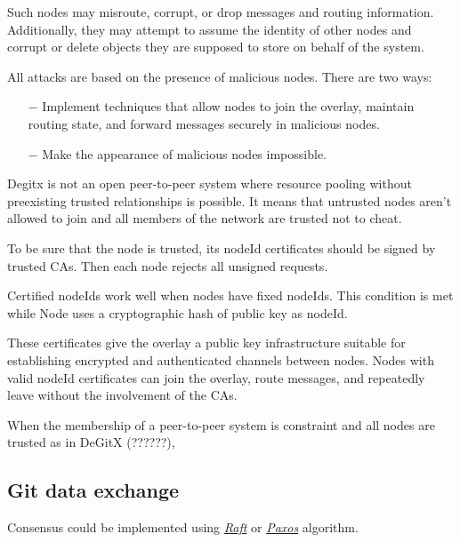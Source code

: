 \documentclass[acmlarge, screen, nonacm]{acmart}
\begin{document}
Such nodes may misroute, corrupt, or drop messages and routing information.
Additionally, they may attempt to assume the identity of other nodes and corrupt or delete objects
they are supposed to store on behalf of the system.

All attacks are based on the presence of malicious nodes.
There are two ways:
\begin{itemize}
  \item[$-$] Implement techniques that allow nodes to join the overlay, maintain routing state, and forward messages securely in malicious nodes.
  \item[$-$] Make the appearance of malicious nodes impossible.
\end{itemize}

Degitx is not an open peer-to-peer system
where resource pooling without preexisting trusted relationships is possible.
It means that untrusted nodes aren't allowed to join
and all members of the network are trusted not to cheat.

To be sure that the node is trusted, its nodeId certificates should be signed by trusted CAs.
Then each node rejects all unsigned requests.

Certified nodeIds work well when nodes have fixed nodeIds.
This condition is met while Node uses a cryptographic hash of public key as nodeId.

These certificates give the overlay a public key infrastructure
suitable for establishing encrypted and authenticated channels between nodes.
Nodes with valid nodeId certificates can join the overlay, route messages,
and repeatedly leave without the involvement of the CAs.

When the membership of a peer-to-peer system is constraint and all nodes are trusted as in DeGitX (??????),

\subsection{Git data exchange}
\label{sec:data}
Consensus could be implemented using \emph{\href{https://raft.github.io/raft.pdf}{Raft}} or
\emph{\href{http://www.cs.yale.edu/homes/aspnes/pinewiki/Paxos.html}{Paxos}} algorithm.
\end{document}
